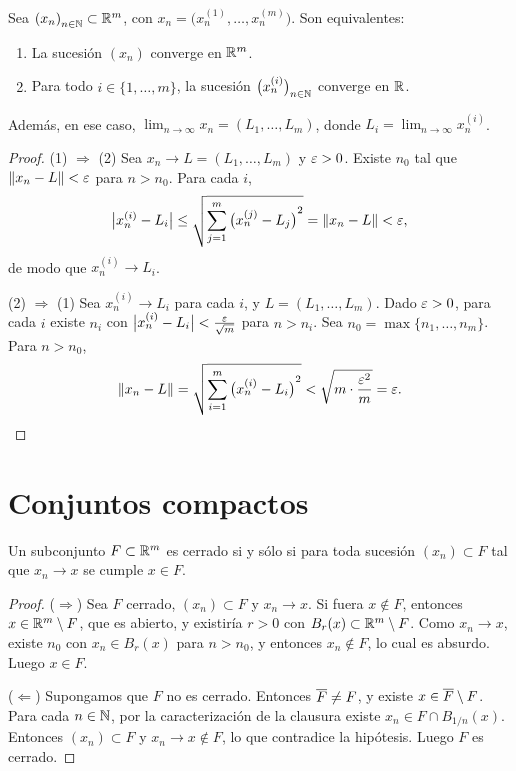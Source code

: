 \begin{prop}
  Sea \({(x_n)}_{n \in \mathbb{N}} \subset \mathbb{R}^m\), con \(x_n = \bigl( x_n^{(1)}, \dots, x_n^{(m)} \bigr)\). Son equivalentes:
  \begin{enumerate}[label=(\arabic*)]
    \item La sucesión \({(x_n)}\) converge en \(\mathbb{R}^m\).
    \item Para todo \(i \in \{1, \dots, m\}\), la sucesión \({\bigl( x_n^{(i)} \bigr)}_{n \in \mathbb{N}}\) converge en \(\mathbb{R}\).
  \end{enumerate}
  Además, en ese caso, \(\lim_{n \to \infty} x_n = (L_1, \dots, L_m)\), donde \(L_i = \lim_{n \to \infty} x_n^{(i)}\).
\end{prop}

\begin{proof}
  (1) \(\Rightarrow\) (2) Sea \(x_n \to L = (L_1, \dots, L_m)\) y \(\varepsilon > 0\). Existe \(n_0\) tal que \(\left\lVert x_n - L \right\rVert < \varepsilon\) para \(n > n_0\). Para cada \(i\),
  \[
    \bigl| x_n^{(i)} - L_i \bigr| \leq \sqrt{\sum_{j=1}^{m} {\bigl( x_n^{(j)} - L_j \bigr)}^2} = \left\lVert x_n - L \right\rVert < \varepsilon,
  \]
  de modo que \(x_n^{(i)} \to L_i\).

  (2) \(\Rightarrow\) (1) Sea \(x_n^{(i)} \to L_i\) para cada \(i\), y \(L = (L_1, \dots, L_m)\). Dado \(\varepsilon > 0\), para cada \(i\) existe \(n_i\) con \(\bigl| x_n^{(i)} - L_i \bigr| < \frac{\varepsilon}{\sqrt{m}}\) para \(n > n_i\). Sea \(n_0 = \max\{n_1, \dots, n_m\}\). Para \(n > n_0\),
  \[
    \left\lVert x_n - L \right\rVert = \sqrt{\sum_{i=1}^{m} {\bigl( x_n^{(i)} - L_i \bigr)}^2} < \sqrt{m \cdot \frac{\varepsilon^2}{m}} = \varepsilon. \qedhere
  \]
\end{proof}

\section{Conjuntos compactos}

\begin{theorem}
  Un subconjunto \(F \subset \mathbb{R}^m\) es cerrado si y sólo si para toda sucesión \({(x_n)} \subset F\) tal que \(x_n \to x\) se cumple \(x \in F\).
\end{theorem}

\begin{proof}
  (\(\Rightarrow\)) Sea \(F\) cerrado, \({(x_n)} \subset F\) y \(x_n \to x\). Si fuera \(x \notin F\), entonces \(x \in \mathbb{R}^m \setminus F\), que es abierto, y existiría \(r > 0\) con \(B_r(x) \subset \mathbb{R}^m \setminus F\). Como \(x_n \to x\), existe \(n_0\) con \(x_n \in B_r(x)\) para \(n > n_0\), y entonces \(x_n \notin F\), lo cual es absurdo. Luego \(x \in F\).

  (\(\Leftarrow\)) Supongamos que \(F\) no es cerrado. Entonces \(\overline{F} \neq F\), y existe \(x \in \overline{F} \setminus F\). Para cada \(n \in \mathbb{N}\), por la caracterización de la clausura existe \(x_n \in F \cap B_{1/n}(x)\). Entonces \({(x_n)} \subset F\) y \(x_n \to x \notin F\), lo que contradice la hipótesis. Luego \(F\) es cerrado.
\end{proof}

